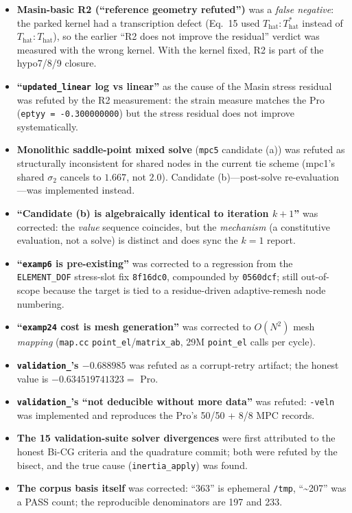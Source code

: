\documentclass[11pt,a4paper]{report}
\newcommand{\code}[1]{\texttt{#1}}
\begin{document}
\begin{itemize}
  \item \textbf{Masin-basic R2 (``reference geometry refuted'')} was a \emph{false
        negative}: the parked kernel had a transcription defect (Eq.~15 used
        $T_{\mathrm{hat}}{:}T_{\mathrm{hat}}^{*}$ instead of
        $T_{\mathrm{hat}}{:}T_{\mathrm{hat}}$), so the earlier ``R2 does not
        improve the residual'' verdict was measured with the wrong kernel. With
        the kernel fixed, R2 is part of the hypo7/8/9 closure.
  \item \textbf{``\code{updated\_\allowbreak linear} log vs linear''} as the cause of the Masin
        stress residual was refuted by the R2 measurement: the strain measure
        matches the Pro (\code{eptyy = -0.300000000}) but the stress residual
        does not improve systematically.
  \item \textbf{Monolithic saddle-point mixed solve} (\code{mpc5} candidate (a))
        was refuted as structurally inconsistent for shared nodes in the current
        tie scheme (mpc1's shared $\sigma_2$ cancels to $1.667$, not $2.0$).
        Candidate (b)---post-solve re-evaluation---was implemented instead.
  \item \textbf{``Candidate (b) is algebraically identical to iteration $k+1$''}
        was corrected: the \emph{value} sequence coincides, but the
        \emph{mechanism} (a constitutive evaluation, not a solve) is distinct and
        does sync the $k=1$ report.
  \item \textbf{``\code{examp6} is pre-existing''} was corrected to a regression
        from the \code{ELEMENT\_\allowbreak DOF} stress-slot fix \code{8f16dc0}, compounded by
        \code{0560dcf}; still out-of-scope because the target is tied to a
        residue-driven adaptive-remesh node numbering.
  \item \textbf{``\code{examp24} cost is mesh generation''} was corrected to
        $O(N^2)$ mesh \emph{mapping} (\code{map.cc} \code{point\_\allowbreak el}/\code{matrix\_\allowbreak ab},
        29M \code{point\_\allowbreak el} calls per cycle).
  \item \textbf{\code{validation\_}'s $-0.688985$} was refuted as a corrupt-retry
        artifact; the honest value is $-0.634519741323 = $ Pro.
  \item \textbf{\code{validation\_}'s ``not deducible without more data''} was
        refuted: \code{-veln} was implemented and reproduces the Pro's 50/50 +
        8/8 MPC records.
  \item \textbf{The 15 validation-suite solver divergences} were first attributed
        to the honest Bi-CG criteria and the quadrature commit; both were refuted
        by the bisect, and the true cause (\code{inertia\_\allowbreak apply}) was found.
  \item \textbf{The corpus basis itself} was corrected: ``363'' is ephemeral
        \code{/\allowbreak tmp}, ``\textasciitilde207'' was a PASS count; the reproducible
        denominators are 197 and 233.
\end{itemize}
\end{document}
